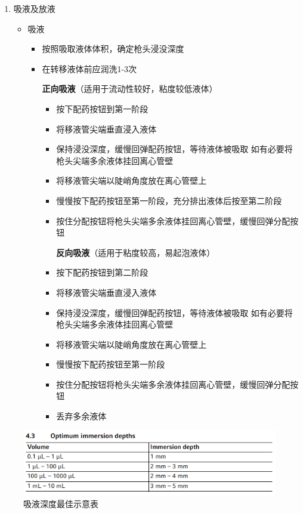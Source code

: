 \documentclass[
]{book}
\providecommand{\tightlist}{%
  \setlength{\itemsep}{0pt}\setlength{\parskip}{0pt}}
\begin{document}
\begin{enumerate}
\def\labelenumi{\arabic{enumi}.}
\setcounter{enumi}{2}
\tightlist
\item
  吸液及放液

  \begin{itemize}
  \item
    吸液

    \begin{itemize}
    \item
      按照吸取液体体积，确定枪头浸没深度
    \item
      在转移液体前应润洗1-3次

      \textbf{正向吸液}（适用于流动性较好，粘度较低液体）

      \begin{itemize}
      \item
        按下配药按钮到第一阶段
      \item
        将移液管尖端垂直浸入液体
      \item
        保持浸没深度，缓慢回弹配药按钮，等待液体被吸取
        如有必要将枪头尖端多余液体挂回离心管壁
      \item
        将移液管尖端以陡峭角度放在离心管壁上
      \item
        慢慢按下配药按钮至第一阶段，充分排出液体后按至第二阶段
      \item
        按住分配按钮将枪头尖端多余液体挂回离心管壁，缓慢回弹分配按钮

        \textbf{反向吸液}（适用于粘度较高，易起泡液体）
      \item
        按下配药按钮到第二阶段
      \item
        将移液管尖端垂直浸入液体
      \item
        保持浸没深度，缓慢回弹配药按钮，等待液体被吸取
        如有必要将枪头尖端多余液体挂回离心管壁
      \item
        将移液管尖端以陡峭角度放在离心管壁上
      \item
        慢慢按下配药按钮至第一阶段
      \item
        按住分配按钮将枪头尖端多余液体挂回离心管壁，缓慢回弹分配按钮
      \item
        丢弃多余液体
      \end{itemize}
    \end{itemize}
  \end{itemize}
\end{enumerate}

\begin{figure}

{\centering \includegraphics[width=0.5\linewidth]{images/Pasted image 20220802014111} 

}

\caption{吸液深度最佳示意表}\label{fig:unnamed-chunk-4}
\end{figure}
\end{document}
